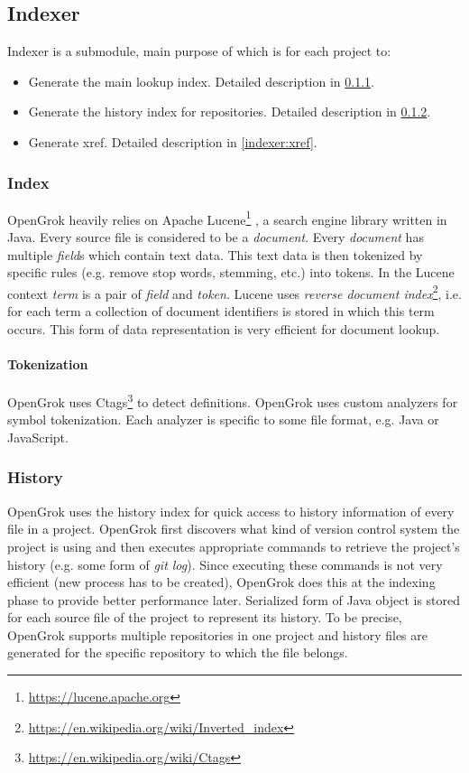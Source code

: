 \subsection{Indexer}
\label{indexer}

Indexer is a submodule, main purpose of which is for each project to:
\begin{itemize}
    \item Generate the main lookup index. Detailed description in \ref{indexer:index}.
    \item Generate the history index for repositories. Detailed description in \ref{indexer:history}.
    \item Generate xref. Detailed description in \ref{indexer:xref}.
\end{itemize}

\subsubsection{Index}
\label{indexer:index}

OpenGrok heavily relies on Apache Lucene\footnote{\url{https://lucene.apache.org}} \citep{lucene_in_action}, a search engine library
written in Java. Every source file is considered to be a \textit{document}. Every \textit{document} has multiple
\textit{field}s which contain text data. This text data is then tokenized by specific rules (e.g. remove stop words,
stemming, etc.) into tokens. In the Lucene context \textit{term} is a pair of \textit{field} and \textit{token}.
Lucene uses \textit{reverse document index}\footnote{\url{https://en.wikipedia.org/wiki/Inverted_index}},
i.e. for each term a collection of document identifiers is stored in which this term occurs.
This form of data representation is very efficient for document lookup.

\paragraph{Tokenization}
OpenGrok uses Ctags\footnote{\url{https://en.wikipedia.org/wiki/Ctags}} to detect definitions.
OpenGrok uses custom analyzers for symbol tokenization. Each analyzer is specific to some file format, e.g. Java or JavaScript.

\subsubsection{History}
\label{indexer:history}

OpenGrok uses the history index for quick access to history information of every file in a project. OpenGrok first discovers
what kind of version control system the project is using and then executes appropriate commands to retrieve the project's
history (e.g. some form of \textit{git log}). Since executing these commands is not very efficient (new process has to
be created), OpenGrok does this at the indexing phase to provide better performance later. Serialized form of Java object
is stored for each source file of the project to represent its history. To be precise, OpenGrok supports multiple repositories
in one project and history files are generated for the specific repository to which the file belongs.

